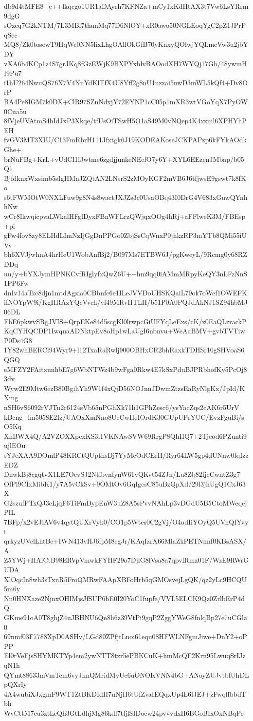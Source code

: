 db9d4tMFE8+e++lkqcgo1UR1aDAyrh7KFNZa+mCy1xKdHtAX3t7Vw6LsYRrm9dgG
sOzeq7G2kNTM/7L3MBl7thunMq77D6NlOY+xR0awo50NGLEoqYgC2pZ1JPrPqSec
MQ8/Zk0tosewT9HqWc0NN5lixLhgOAllOkGfB70yKnxyQOlwjYQLmcVw3u2jbYDY
vXA6b4KCp1z4S7grJKq8fGzEWjK9BXPYxhlvBAOodXH7WYQj17Gh/48ywmHI9Pu7
i1hU264NwuQS76X7V4NnYdKlTfX4U8Yff2g8nU1uzzai5nwD3mWL5kQf4+Dv8OrP
BA4Pe8IGM7k0DX+ClR97SZnNdxjY72EYNP1cC05p1mXR3wtVGoYqX7PyOW0Cua5u
8fVjeUVAtmS4hIdJxP3Xkqe/tfUsOiTSwH5O1aS49M0vNQep4K4xzml6XPHYhPEH
fvGV3MT3XIU/C13FmRbrH111Jfxtgk6J19KODEAKoseJCKPAPzp6kFYkAOdkGhe+
brNuFBg+KrL+vUdCI1lJwtme6zgdjjunkeNEefO7y6Y+XYL6EEzenJMbap/b05Q1
BjfdknxWxsimb5sIgHMnJZQtAN2LNsrS2zMOyKGF2mVB6J6tfjwsE9gswt7k8fKo
s6tFWMOtW0NXLFuw9g8N4s8wactJXJZs3c0UsaOBq43I0DrG4V683xGuwQYnhhNw
wCr8IkwqicpvaLWkalHFglDyxFBnWFLrzQWjqxOOg4hRj+aFFlweK3M/FBEsp+pi
gFw4fov8zy8ELHdLImNzIjGgDnPPGo0ZbjSsCqWnxP0jhkzRP3mYTb8QMi55iUVv
bh6XVJjwhnA4hrHeU1WobAnfBj2/B097Ms7ETBW6J/pgKweyL/9Rcmg0y68RZDDq
uu/y+bYXJymHPNKCvfRIglyfxQwZ6U++hm9qq0iAMmMRpyKeQY3nLFzNnS1PP6Fw
dnIv14aTzc8djn1mtdAgzia0CBbnfc6e1ILeJVVDoUHSKQaiL79ok7oWef1OWEFK
ifNOYpW9i/KgHRAzYQcVvch/vf49MRvHTLH/b51P0A0PQJdAkNJ1SZ94hbMJ06DL
FhE6pkwvSRgJVIS+QrpEKe84d5scgKl0lrwpcGiUFYqLeExs/cK/z0EaQLzrackP
KqCYHQCDP1IwquaADNktpEv8oHp1wLaUgI6nbnvu+WeAaBMV+gvbTVTiwP0Ds4G8
1Y82whBERCl94Wyr9+l12TxaRaRwlj900OBHxCR2bhRaxkTDHSr10gSHVoaS6QGQ
eMFZY2FAitxunhbE7g6WbNTWz4b9wFga0Rkw4E7kSxPduBJPRbhofKy5PcOj83dv
Wyw2E9Mtw6ezB80BgihYh9W1f4xQjD56NOJnnJDwmZtzsEaRyNlgKx/JpId/KXmg
nSH6vS6092rVJTu2r6124sVb65nPGhXk71li1GPhZesc6/ysYacZqs2cAK6r5UrV
kBcng+hn5058E2Iz/UAOxXmNno8UeCwHeIOrdK30GUpUPrYUC/EvzFguBi/sO5Kq
XnBWX4Q/A2VZOXXpcxKS3l1VKNAwSVW69RrgP8QhHQ7+2Tjcod6PZunti9ujlEOu
sYJeXAA9DOmlP48KRCtQUpthsDj7YyMcOdCErH/Ryr64LW5gp4dUNnw0fqIzzEDZ
DnwkBj8cgqtvX1LE7OevSJ2NtibvnfynW61vQKvt54ZJn/Lu8Zb82fjeCwntZ3g7
OfPi9CIxMibK1/y7A5vCkSv+9OMtOv6GqIgcsC85uBzQpXd/29l3jhUgQ1CxJ63X
G2szufPTxQJ3eLjqF6TiFmDypEnW3uZ8A5sPvvNAhLp3vDGdU5B5CtoMWeqejPIL
7BFp/x2vEJiAV6v4qytQUXrVyk0/CO1p5Wtes0C2gVj/O4odIiYOyQ5UVnQIYvyi
qrkyzUVclLhtBe+IWN413vHJ6fpM8cgJr/KAqIzrX66MlaZkPETNnnf0KBsASX/A
Z5YWj+HAiCtB98ERVpVmwkFYHF29o7DjlG8lVsa8a7qpvlRmz01F/WzE9RWrGUDA
XlOqcIn8wh3sTxnR5FroQMRwFAApXBFoHrb5qGMOsvejLgQK/qz2yLc9HCQU5m6y
Nn0HNXaze2NjnxOHIMjsJfSUP6bE0I20YoC1fupfe/VVL5ELCK9Qz0ZrlbErP4dQ
GKme91oA0T8ghjZ4uJBHNU6Qn8h6z39VtPi9gqP2ZggYWeG8fnlqBp27e7uCGla0
69nmf03F7788XpD0ASHv/LGd80ZPfjtLnoi61equ08HFWLNFgmJiwe+DnY2+oPPP
El0rVeFjsSHYMKTYp4em2ywNTT8tzr5ePBKCuK+hmMcQF2Krn95LwuqSrIJzqN1h
QYmt88633mVmTcm6vyJhnQMridMyUc6uONOKVNN4bG+ANoyZUJvtbfUhDLpQXrIy
4A4wubiXJxgmF9WT1ZtBKDIdH7uNjH6tUfZvaIEQqxUp4L6fJEJ+zFwqffbbdTbh
WvCttM7eu3ztLeQh3GtLdhjMg86kdl7tfjlSIDoew24pvvvdxH6BGoBIxOxNBqPe
